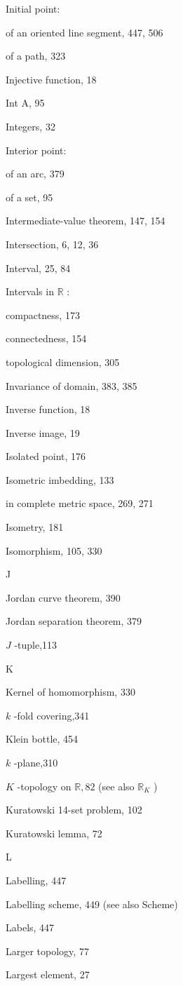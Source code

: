 Initial point:

of an oriented line segment, 447, 506

of a path, 323

Injective function, 18

Int A, 95

Integers, 32

Interior point:

of an arc, 379

of a set, 95

Intermediate-value theorem, 147, 154

Intersection, 6, 12, 36

Interval, 25, 84

Intervals in \(\mathbb{R}\) :

compactness, 173

connectedness, 154

topological dimension, 305

Invariance of domain, 383, 385

Inverse function, 18

Inverse image, 19

Isolated point, 176

Isometric imbedding, 133

in complete metric space, 269, 271

Isometry, 181

Isomorphism, 105, 330

J

Jordan curve theorem, 390

Jordan separation theorem, 379

\(J\) -tuple,113

K

Kernel of homomorphism, 330

\(k\) -fold covering,341

Klein bottle, 454

\(k\) -plane,310

\(K\) -topology on \(\mathbb{R},{82}\) (see also \({\mathbb{R}}_{K}\) )

Kuratowski 14-set problem, 102

Kuratowski lemma, 72

L

Labelling, 447

Labelling scheme, 449 (see also Scheme)

Labels, 447

Larger topology, 77

Largest element, 27

